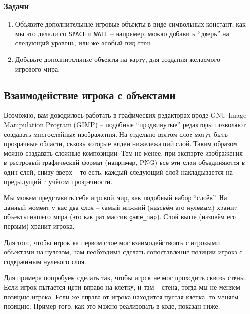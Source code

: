 \documentclass[../sparc.tex]{subfiles}
\begin{document}
\subsubsection{Задачи}
\begin{enumerate}
\item Объявите дополнительные игровые объекты в виде символьных констант, как мы
  это делали со \texttt{SPACE} и \texttt{WALL} -- например, можно добавить
  ``дверь'' на следующий уровень, или же особый вид стен.
\item Добавьте дополнительные объекты на карту, для создания желаемого игрового
  мира.
\end{enumerate}

\subsection{Взаимодействие игрока с объектами}

Возможно, вам доводилось работать в графических редакторах вроде GNU Image
Manipulation Program (GIMP) -- подобные ``продвинутые'' редакторы позволяют
создавать многослойные изображения.  На отдельно взятом слое могут быть
прозрачные области, сквозь которые виден нижележащий слой.  Таким образом можно
создавать сложные композиции.  Тем не менее, при экспорте изображения в
растровый графический формат (например, PNG) все эти слои объединяются в один
слой, снизу вверх -- то есть, каждый следующий слой накладывается на предыдущий
с учётом прозрачности.

Мы можем представить себе игровой мир, как подобный набор ``слоёв''.  На данный
момент у нас два слоя -- самый нижний (назовём его нулевым) хранит объекты
нашего мира (это как раз массив \texttt{game\_map}).  Слой выше (назовём его
первым) хранит игрока.

Для того, чтобы игрок на первом слое мог взаимодействоать с игровыми объектами
на нулевом, нам необходимо сделать сопоставление позиции игрока с содержимым
нулевого слоя.

Для примера попробуем сделать так, чтобы игрок не мог проходить сквозь стены.
Если игрок пытается идти вправо на клетку, и там -- стена, тогда мы не меняем
позицию игрока. Если же справа от игрока находится пустая клетка, то меняем
позицию.  Пример того, как это можно реализовать в коде, показан ниже.
\end{document}
